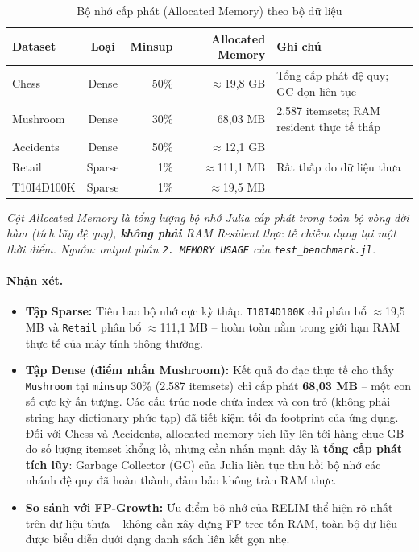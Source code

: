 \documentclass[12pt,a4paper]{report}
\begin{document}
\begin{table}[H]
    \centering
    \caption{Bộ nhớ cấp phát (Allocated Memory) theo bộ dữ liệu}
    \label{tab:memory}
    \begin{tabularx}{\textwidth}{|l|c|r|r|X|}
    \hline
    \textbf{Dataset} & \textbf{Loại} & \textbf{Minsup} & \textbf{Allocated Memory} & \textbf{Ghi chú} \\
    \hline
    Chess      & Dense  & 50\%   & $\approx$19{,}8 GB & Tổng cấp phát đệ quy; GC dọn liên tục \\
    \hline
    Mushroom   & Dense  & 30\%   & 68{,}03 MB         & 2.587 itemsets; RAM resident thực tế thấp \\
    \hline
    Accidents  & Dense  & 50\%   & $\approx$12{,}1 GB & \\
    \hline
    Retail     & Sparse & 1\%    & $\approx$111{,}1 MB & Rất thấp do dữ liệu thưa \\
    \hline
    T10I4D100K & Sparse & 1\%    & $\approx$19{,}5 MB & \\
    \hline
    \end{tabularx}
    \par\smallskip
    \footnotesize\textit{Cột Allocated Memory là tổng lượng bộ nhớ Julia cấp phát
    trong toàn bộ vòng đời hàm (tích lũy đệ quy), \textbf{không phải} RAM Resident
    thực tế chiếm dụng tại một thời điểm. Nguồn: output phần \texttt{2. MEMORY USAGE}
    của \texttt{test\_benchmark.jl}.}
\end{table}

\paragraph{Nhận xét.}
\begin{itemize}
    \item \textbf{Tập Sparse:} Tiêu hao bộ nhớ cực kỳ thấp.
          \texttt{T10I4D100K} chỉ phân bổ $\approx$19{,}5 MB và
          \texttt{Retail} phân bổ $\approx$111{,}1 MB -- hoàn toàn nằm trong
          giới hạn RAM thực tế của máy tính thông thường.
    \item \textbf{Tập Dense (điểm nhấn Mushroom):} Kết quả đo đạc thực tế cho thấy
          \texttt{Mushroom} tại \texttt{minsup} 30\% (2.587 itemsets) chỉ cấp phát
          \textbf{68{,}03 MB} -- một con số cực kỳ ấn tượng. Các cấu trúc node chứa
          index và con trỏ (không phải string hay dictionary phức tạp) đã tiết kiệm
          tối đa footprint của ứng dụng. Đối với Chess và Accidents, allocated memory
          tích lũy lên tới hàng chục GB do số lượng itemset khổng lồ, nhưng cần nhấn
          mạnh đây là \textbf{tổng cấp phát tích lũy}: Garbage Collector (GC) của
          Julia liên tục thu hồi bộ nhớ các nhánh đệ quy đã hoàn thành, đảm bảo
          không tràn RAM thực.
    \item \textbf{So sánh với FP-Growth:} Ưu điểm bộ nhớ của RELIM thể hiện rõ
          nhất trên dữ liệu thưa -- không cần xây dựng FP-tree tốn RAM, toàn bộ
          dữ liệu được biểu diễn dưới dạng danh sách liên kết gọn nhẹ.
\end{itemize}
\end{document}
